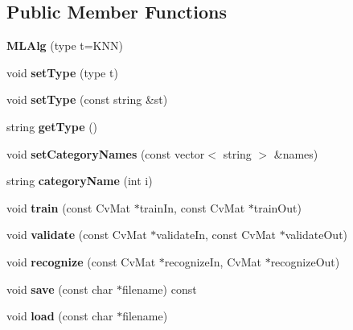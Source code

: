 \subsection*{Public Member Functions}
\begin{DoxyCompactItemize}
\item 
\hypertarget{class_m_l_alg_abe64a2a987f3564d4b8a555bc028a628}{{\bfseries M\-L\-Alg} (type t=K\-N\-N)}\label{class_m_l_alg_abe64a2a987f3564d4b8a555bc028a628}

\item 
\hypertarget{class_m_l_alg_ad91e8880931c1c1a4cffd06dd9abfbe7}{void {\bfseries set\-Type} (type t)}\label{class_m_l_alg_ad91e8880931c1c1a4cffd06dd9abfbe7}

\item 
\hypertarget{class_m_l_alg_a9189e74165b45c44b404660a67bdbfe8}{void {\bfseries set\-Type} (const string \&st)}\label{class_m_l_alg_a9189e74165b45c44b404660a67bdbfe8}

\item 
\hypertarget{class_m_l_alg_a7cc0abdf363c12ec83ee63119b81d19c}{string {\bfseries get\-Type} ()}\label{class_m_l_alg_a7cc0abdf363c12ec83ee63119b81d19c}

\item 
\hypertarget{class_m_l_alg_a44f120e39108980863a3fac855f89106}{void {\bfseries set\-Category\-Names} (const vector$<$ string $>$ \&names)}\label{class_m_l_alg_a44f120e39108980863a3fac855f89106}

\item 
\hypertarget{class_m_l_alg_ad62d73beb4bd63465a4bf24644df420f}{string {\bfseries category\-Name} (int i)}\label{class_m_l_alg_ad62d73beb4bd63465a4bf24644df420f}

\item 
\hypertarget{class_m_l_alg_af50750d469efca6635f056471423c619}{void {\bfseries train} (const Cv\-Mat $\ast$train\-In, const Cv\-Mat $\ast$train\-Out)}\label{class_m_l_alg_af50750d469efca6635f056471423c619}

\item 
\hypertarget{class_m_l_alg_af7cd4f07c40c55a603e3a6dcaf5f287d}{void {\bfseries validate} (const Cv\-Mat $\ast$validate\-In, const Cv\-Mat $\ast$validate\-Out)}\label{class_m_l_alg_af7cd4f07c40c55a603e3a6dcaf5f287d}

\item 
\hypertarget{class_m_l_alg_ae05ba5c235d576a81f2a82eef06448ed}{void {\bfseries recognize} (const Cv\-Mat $\ast$recognize\-In, Cv\-Mat $\ast$recognize\-Out)}\label{class_m_l_alg_ae05ba5c235d576a81f2a82eef06448ed}

\item 
\hypertarget{class_m_l_alg_a368d08fe8e04e626e56bd17d531ef795}{void {\bfseries save} (const char $\ast$filename) const }\label{class_m_l_alg_a368d08fe8e04e626e56bd17d531ef795}

\item 
\hypertarget{class_m_l_alg_a3651488762f2ba0d7f28e9ee114674bf}{void {\bfseries load} (const char $\ast$filename)}\label{class_m_l_alg_a3651488762f2ba0d7f28e9ee114674bf}

\end{DoxyCompactItemize}
